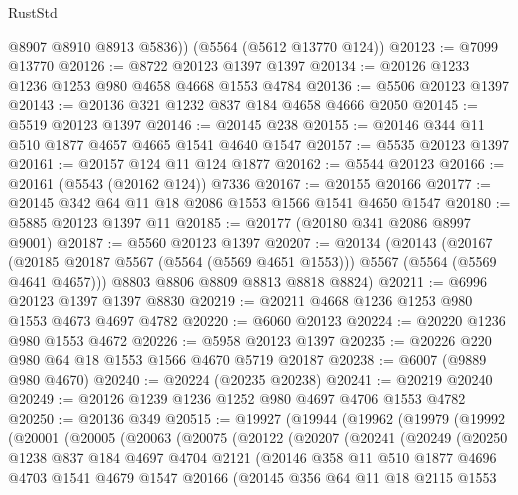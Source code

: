 \begin{lexlean}{RustStd}
\begin{coremodule}
        @8907
        @8910
        @8913
        @5836))
    (@5564 (@5612 @13770 @124))
@20123 := @7099 @13770
@20126 := @8722 @20123 @1397 @1397
@20134 := @20126 @1233 @1236 @1253 @980 @4658 @4668 @1553 @4784
@20136 := @5506 @20123 @1397
@20143 := @20136 @321 @1232 @837 @184 @4658 @4666 @2050
@20145 := @5519 @20123 @1397
@20146 := @20145 @238
@20155 := @20146 @344 @11 @510 @1877 @4657 @4665 @1541 @4640 @1547
@20157 := @5535 @20123 @1397
@20161 := @20157 @124 @11 @124 @1877
@20162 := @5544 @20123
@20166 := @20161 (@5543 (@20162 @124)) @7336
@20167 := @20155 @20166
@20177 := @20145 @342 @64 @11 @18 @2086 @1553 @1566 @1541 @4650 @1547
@20180 := @5885 @20123 @1397 @11
@20185 := @20177 (@20180 @341 @2086 @8997 @9001)
@20187 := @5560 @20123 @1397
@20207 := @20134
    (@20143
      (@20167 (@20185 @20187 @5567 (@5564 (@5569 @4651 @1553))) @5567 (@5564 (@5569 @4641 @4657)))
      @8803
      @8806
      @8809
      @8813
      @8818
      @8824)
@20211 := @6996 @20123 @1397 @1397 @8830
@20219 := @20211 @4668 @1236 @1253 @980 @1553 @4673 @4697 @4782
@20220 := @6060 @20123
@20224 := @20220 @1236 @980 @1553 @4672
@20226 := @5958 @20123 @1397
@20235 := @20226 @220 @980 @64 @18 @1553 @1566 @4670 @5719 @20187
@20238 := @6007 (@9889 @980 @4670)
@20240 := @20224 (@20235 @20238)
@20241 := @20219 @20240
@20249 := @20126 @1239 @1236 @1252 @980 @4697 @4706 @1553 @4782
@20250 := @20136 @349
@20515 := @19927
    (@19944
      (@19962
        (@19979
          (@19992
            (@20001
              (@20005
                (@20063
                  (@20075
                    (@20122
                      (@20207
                        (@20241
                          (@20249
                            (@20250
                              @1238
                              @837
                              @184
                              @4697
                              @4704
                              @2121
                              (@20146
                                @358
                                @11
                                @510
                                @1877
                                @4696
                                @4703
                                @1541
                                @4679
                                @1547
                                @20166
                                (@20145
                                  @356
                                  @64
                                  @11
                                  @18
                                  @2115
                                  @1553

\end{coremodule}
\end{lexlean}
